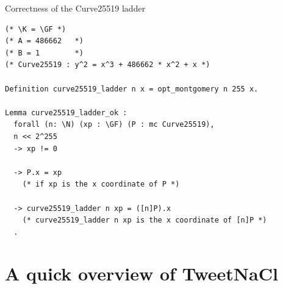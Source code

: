 \documentclass[8pt]{beamer}
\begin{document}
\begin{frame}[fragile]{Correctness of the Curve25519 ladder}
\begin{center}
\begin{lstlisting}[language=Coq, basicstyle=\large]
(* \K = \GF *)
(* A = 486662   *)
(* B = 1        *)
(* Curve25519 : y^2 = x^3 + 486662 * x^2 + x *)

Definition curve25519_ladder n x = opt_montgomery n 255 x.

Lemma curve25519_ladder_ok :
  forall (n: \N) (xp : \GF) (P : mc Curve25519),
  n << 2^255
  -> xp != 0

  -> P.x = xp
    (* if xp is the x coordinate of P *)

  -> curve25519_ladder n xp = ([n]P).x
    (* curve25519_ladder n xp is the x coordinate of [n]P *)
  .
\end{lstlisting}
\end{center}
\end{frame}

\section{A quick overview of TweetNaCl}
\end{document}
